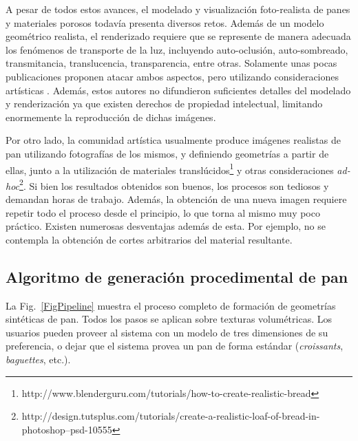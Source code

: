 A pesar de todos estos avances, el modelado y visualización foto-realista de panes y materiales porosos todavía presenta diversos retos.
Además de un modelo geométrico realista, el renderizado requiere que se represente de manera adecuada los fenómenos de transporte de la luz, incluyendo auto-oclusión, auto-sombreado, transmitancia, translucencia, transparencia, entre otras.
Solamente unas pocas publicaciones proponen atacar ambos aspectos, pero utilizando consideraciones artísticas \cite{Xenakis2007}.
Además, estos autores no difundieron suficientes detalles del modelado y renderización ya que existen derechos de propiedad intelectual, limitando enormemente la reproducción de dichas imágenes.

Por otro lado, la comunidad artística usualmente produce imágenes realistas de pan utilizando fotografías de los mismos, y definiendo geometrías a partir de ellas, junto a la utilización de materiales translúcidos\footnote{http://www.blenderguru.com/tutorials/how-to-create-realistic-bread} y otras consideraciones {\em ad-hoc}\footnote{http://design.tutsplus.com/tutorials/create-a-realistic-loaf-of-bread-in-photoshop--psd-10555}.
Si bien los resultados obtenidos son buenos, los procesos son tediosos y demandan horas de trabajo.
Además, la obtención de una nueva imagen requiere repetir todo el proceso desde el principio, lo que torna al mismo muy poco práctico.
Existen numerosas desventajas además de esta.
Por ejemplo, no se contempla la obtención de cortes arbitrarios del material resultante.


\subsection{Algoritmo de generación procedimental de pan}
La Fig.~\ref{FigPipeline} muestra el proceso completo de formación de geometrías sintéticas de pan.
Todos los pasos se aplican sobre texturas volumétricas.
Los usuarios pueden proveer al sistema con un modelo de tres dimensiones de su preferencia, o dejar que el sistema provea un pan de forma estándar ({\em croissants}, {\em baguettes}, etc.).

